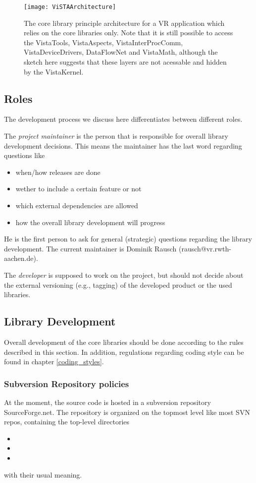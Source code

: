 \begin{figure}
\begin{center}
\texttt{[image: ViSTAArchitecture]}
\end{center}
\caption{\label{fig:ViSTAArchitecture}
  The  core library principle architecture for a VR application which relies on the  core libraries only.
  Note that it is still possible to access the VistaTools, VistaAspects, VistaInterProcComm, VistaDeviceDrivers, DataFlowNet and VistaMath, although the sketch here suggests that these layers are not acessable and hidden by the VistaKernel.}
\end{figure}
 
\subsection{Roles}
The development process we discuss here differentiates between different roles.

The \textit{project maintainer} is the person that is responsible for overall library development decisions.
This means the maintainer has the last word regarding questions like
\begin{itemize}
\item when/how releases are done
\item wether to include a certain feature or not
\item which external dependencies are allowed
\item how the overall library development will progress
\end{itemize}
He is the first person to ask for general (strategic) questions regarding the library development.
The current  maintainer is Dominik Rausch (rausch@vr.rwth-aachen.de).

The \textit{developer} is supposed to work on the project, but should not decide about the external versioning (e.g., tagging) of the developed product or the used libraries.

\subsection{Library Development}
Overall development of the  core libraries should be done according to the rules described in this section.
In addition, regulations regarding coding style can be found in chapter \ref{coding_styles}.

\subsubsection{Subversion Repository policies}
At the moment, the  source code is hosted in a subversion repository SourceForge.net.
The repository is organized on the topmost level like most SVN repos, containing the top-level directories
\begin{itemize}
\item{}
\item{}
\item{}
\end{itemize}
with their usual meaning.

